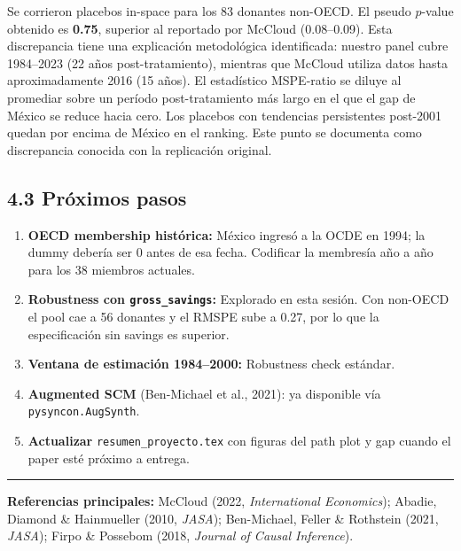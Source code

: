 \documentclass[11pt,a4paper]{article}
\begin{document}
Se corrieron placebos in-space para los 83 donantes non-OECD. El pseudo $p$-value obtenido es \textbf{0.75}, superior al reportado por McCloud (0.08–0.09). Esta discrepancia tiene una explicación metodológica identificada: nuestro panel cubre 1984–2023 (22 años post-tratamiento), mientras que McCloud utiliza datos hasta aproximadamente 2016 (15 años). El estadístico MSPE-ratio se diluye al promediar sobre un período post-tratamiento más largo en el que el gap de México se reduce hacia cero. Los placebos con tendencias persistentes post-2001 quedan por encima de México en el ranking. Este punto se documenta como discrepancia conocida con la replicación original.

\subsection*{4.3 Próximos pasos}

\begin{enumerate}[nosep]
    \item \textbf{OECD membership histórica:} México ingresó a la OCDE en 1994; la dummy debería ser 0 antes de esa fecha. Codificar la membresía año a año para los 38 miembros actuales.
    \item \textbf{Robustness con \texttt{gross\_savings}:} Explorado en esta sesión. Con non-OECD el pool cae a 56 donantes y el RMSPE sube a 0.27, por lo que la especificación sin savings es superior.
    \item \textbf{Ventana de estimación 1984–2000:} Robustness check estándar.
    \item \textbf{Augmented SCM} (Ben-Michael et al., 2021): ya disponible vía \texttt{pysyncon.AugSynth}.
    \item \textbf{Actualizar} \texttt{resumen\_proyecto.tex} con figuras del path plot y gap cuando el paper esté próximo a entrega.
\end{enumerate}

\vspace{6pt}
\noindent\rule{\textwidth}{0.4pt}
\vspace{4pt}
{\footnotesize\textbf{Referencias principales:} McCloud (2022, \textit{International Economics}); Abadie, Diamond \& Hainmueller (2010, \textit{JASA}); Ben-Michael, Feller \& Rothstein (2021, \textit{JASA}); Firpo \& Possebom (2018, \textit{Journal of Causal Inference}).}
\end{document}
